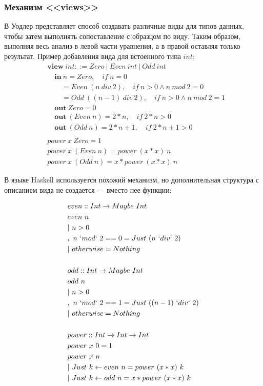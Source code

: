 \label{dependent-pattern-matching-extensions}

\subsubsection{Механизм <<views>>}\label{the-view-from-the-left}

В \cite{views} Уодлер представляет способ создавать различные виды для
типов данных, чтобы затем выполнять сопоставление с образцом по виду. Таким
образом, выполняя весь анализ в левой части уравнения, а в правой оставляя только
результат. Пример добавления вида для встоенного типа \(int\):
\begin{align*}
&\mathbf{view}\ int ::= Zero\ |\ Even\ int\ |\ Odd\ int\\
&\quad \mathbf{in}\ n = Zero,\quad if\ n = 0\\
&\qquad = Even\ (n\ div\ 2),\quad if\ n > 0 \land n\ mod\ 2 = 0\\
&\qquad = Odd\ ((n - 1)\ div\ 2),\quad if\ n > 0 \land n\ mod\ 2 = 1\\
&\quad \mathbf{out}\ Zero = 0\\
&\quad \mathbf{out}\ (Even\ n) = 2 * n,\quad if\ 2 * n > 0\\
&\quad \mathbf{out}\ (Odd\ n) = 2 * n + 1,\quad if\ 2 * n + 1 > 0\\
\\
&power\ x\ Zero = 1\\
&power\ x\ (Even\ n) = power\ (x * x)\ n\\
&power\ x\ (Odd\ n) = x * power\ (x * x)\ n
\end{align*}

В языке Haskell используется похожий механизм, но дополнительная структура с
описанием вида не создается --- вместо нее функции:

\begin{align*}
&even :: Int \to Maybe\ Int\\
&even\ n\\
&|\ n > 0\\
&,\ n\ `mod`\ 2 == 0 = Just\ (n\ `div`\ 2)\\
&|\ otherwise = Nothing\\
\\
&odd :: Int \to Maybe\ Int\\
&odd\ n\\
&|\ n > 0\\
&,\ n\ `mod`\ 2 == 1 = Just\ ((n - 1)\ `div`\ 2)\\
&|\ otherwise = Nothing\\
\\
&power :: Int \to Int \to Int\\
&power\ x\ 0 = 1\\
&power\ x\ n\\
&|\ Just\ k \leftarrow even\ n = power\ (x * x)\ k\\
&|\ Just\ k \leftarrow odd\ n = x * power\ (x * x)\ k
\end{align*}

